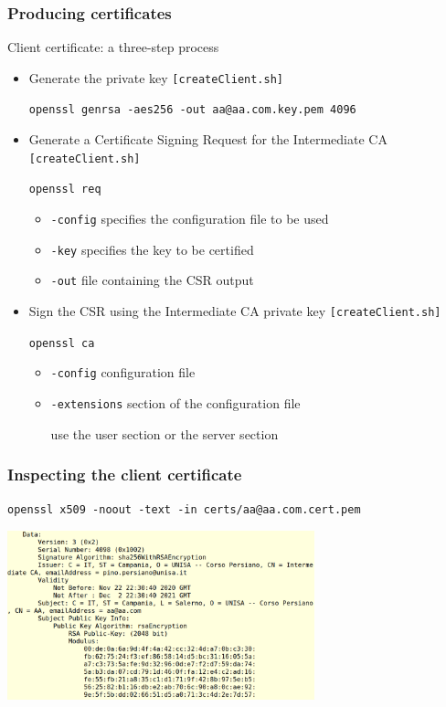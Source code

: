 \documentclass[]{beamer}
\begin{document}
\begin{frame}
\frametitle{Producing certificates}
\begin{block}{Client certificate: a three-step process}
\begin{itemize}
\item Generate the private key {\tt [createClient.sh]}

    {\color{brown} \tt openssl genrsa -aes256 -out aa@aa.com.key.pem 4096}

\item Generate a Certificate Signing Request for the Intermediate CA
{\tt [createClient.sh]}

    {\color{brown} \tt openssl req}

    \begin{itemize}
        \item {\tt -config} specifies the configuration file to be used
        \item {\tt -key} specifies the key to be certified
        \item {\tt -out} file containing the CSR output
    \end{itemize}

\item Sign the CSR using the Intermediate CA private key 
{\tt [createClient.sh]}

    {\color{brown} \tt openssl ca}
    \begin{itemize}
        \item {\tt -config} configuration file 
        \item {\tt -extensions} section of the configuration file
            
            use the  user section or the server section 
    \end{itemize}

\end{itemize}
\end{block}
\end{frame}

\begin{frame}
\frametitle{Inspecting the client certificate}

\centerline{\color{magenta} \tt openssl x509 -noout -text -in certs/aa@aa.com.cert.pem}

\begin{center}
\includegraphics[width=3.5in]{imgs/clientCert.png}
\end{center}
\end{frame}
\end{document}
